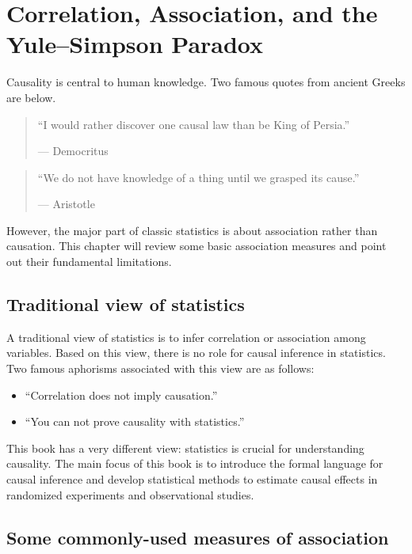 
\chapter{Correlation, Association, and the Yule--Simpson Paradox}
 \label{chapter::correlationassociation}
 
 
Causality is central to human knowledge. Two famous quotes from ancient Greeks are below. 


\begin{quote}
``I would rather discover one causal law than be King of Persia.''

---  Democritus 
\end{quote}


\begin{quote}
``We do not have knowledge of a thing until we grasped its cause.''

--- Aristotle 
\end{quote}
 
 
However, the major part of classic statistics is about association rather than causation.  This chapter will review some basic association measures and point out their fundamental limitations. 
 

\section{Traditional view of statistics}

A traditional view of statistics is to infer correlation or association among variables. Based on this view, there is no role for causal inference in statistics. Two famous aphorisms associated with this view are as follows:

\begin{itemize}
\item
``Correlation does not imply causation.''

\item
``You can not prove causality with statistics.'' 
\end{itemize}

This book has a very different view: statistics is crucial for understanding causality. The main focus of this book is to introduce the formal language for causal inference and develop statistical methods to estimate causal effects in randomized experiments and observational studies. 




 
\section{Some commonly-used measures of association}


